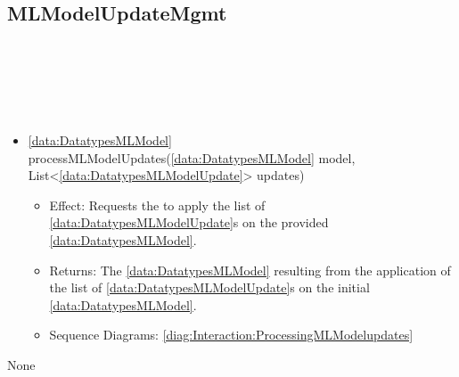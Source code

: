   \subsection{MLModelUpdateMgmt}\label{int:InterfacesMLModelUpdateMgmt}
    \begin{description}
      \item[Provided by:] \iconcomponent{}~
      \item[Required by:] \iconcomponent{}~ 
      \item[Operations:] ~
    \begin{itemize}[noitemsep,nolistsep,leftmargin=-.25cm]
      \item \textsf{\ref{data:DatatypesMLModel} processMLModelUpdates(\ref{data:DatatypesMLModel} model, List\textless{}\ref{data:DatatypesMLModelUpdate}\textgreater{} updates)}
        \begin{itemize}[noitemsep,nolistsep]
           \item Effect: Requests the  to apply the list of  \ref{data:DatatypesMLModelUpdate}s on the provided \ref{data:DatatypesMLModel}. 
           \item Returns: The \ref{data:DatatypesMLModel} resulting from the application of the list of \ref{data:DatatypesMLModelUpdate}s on the initial \ref{data:DatatypesMLModel}.
           \item Sequence Diagrams: \cref{diag:Interaction:ProcessingMLModelupdates}
        \end{itemize}
    \end{itemize}
      \item[Diagrams:] None
    \end{description}

